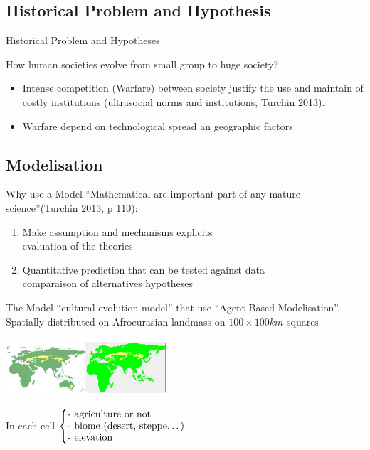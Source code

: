 \documentclass{beamer}
\begin{document}
\subsection{Historical Problem and Hypothesis }
\begin{frame}{Historical Problem and Hypotheses}
    \begin{block}{How human societies evolve from small group to huge society?}
	\begin{itemize}
	    \item Intense competition (Warfare) between society justify the use and maintain of costly institutions (ultrasocial norms and institutions, Turchin 2013).
	    \item Warfare depend on technological spread an geographic factors
	\end{itemize}
    \end{block}
\end{frame}

\subsection{Modelisation}
\begin{frame}{Why use a Model}
    ``Mathematical are important part of any mature science''(Turchin 2013, p 110):
    \begin{enumerate}
	\item Make assumption and mechanisms explicits \\
	    \rightarrow evaluation of the theories
	\item Quantitative prediction that can be tested against data \\ 
	    \rightarrow comparaison of alternatives hypotheses
    \end{enumerate}
\end{frame}

\begin{frame}{The Model}
     ``cultural evolution model'' that use ``Agent Based Modelisation''.
     Spatially distributed on Afroeurasian landmass on $100\times 100km$ squares
	 \begin{center}
	     \includegraphics[width=6cm]{images/afroeurasian}
	 \end{center}
	 In each cell $\left\{
	     \begin{tabular}{@{}l@{}}
		     - agriculture or not \\
		     - biome (desert, steppe\ldots)\\
		     - elevation\\
		 \end{tabular}
	     \right.$
\end{frame}
\end{document}

